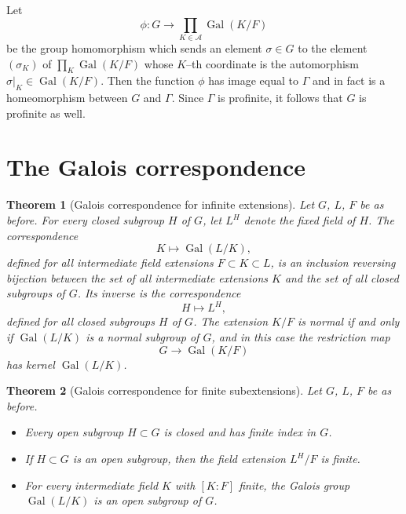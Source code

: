 \documentclass[12pt]{article}
\newcommand{\A}{\mathcal{A}}
\newcommand{\lra}{\longrightarrow}
\newcommand{\Gal}{\operatorname{Gal}}
\newtheorem{theorem}{Theorem}
\theoremstyle{definition}
\begin{document}
Let
$$
\phi: G \lra \prod_{K \in \A} \Gal(K/F)
$$
be the group homomorphism which sends an element $\sigma \in G$ to the
element $(\sigma_K)$ of $\prod_K \Gal(K/F)$ whose $K$--th coordinate
is the automorphism $\sigma|_K \in \Gal(K/F)$. Then the function
$\phi$ has image equal to $\Gamma$ and in fact is a homeomorphism
between $G$ and $\Gamma$. Since $\Gamma$ is profinite, it follows that
$G$ is profinite as well.

\section{The Galois correspondence}

\begin{theorem}[Galois correspondence for infinite extensions]
Let $G$, $L$, $F$ be as before. For every closed subgroup $H$ of $G$,
  let $L^H$ denote the fixed field of $H$. The correspondence
$$
K \mapsto \Gal(L/K),
$$
defined for all intermediate field extensions $F \subset K \subset L$,
is an inclusion reversing bijection between the set of all
intermediate extensions $K$ and the set of all closed subgroups of
$G$. Its inverse is the correspondence
$$
H \mapsto L^H,
$$
defined for all closed subgroups $H$ of $G$. The extension $K/F$ is
normal if and only if $\Gal(L/K)$ is a normal subgroup of $G$, and in
this case the restriction map
$$
G \lra \Gal(K/F)
$$
has kernel $\Gal(L/K)$.
\end{theorem}

\begin{theorem}[Galois correspondence for finite subextensions]
Let $G$, $L$, $F$ be as before.
\begin{itemize}
\item Every open subgroup $H \subset G$ is closed and has finite index
  in $G$.
\item If $H \subset G$ is an open subgroup, then the field extension
  $L^H/F$ is finite.
\item For every intermediate field $K$ with $[K:F]$ finite, the Galois
  group $\Gal(L/K)$ is an open subgroup of $G$.
\end{itemize}
\end{theorem}
\end{document}
